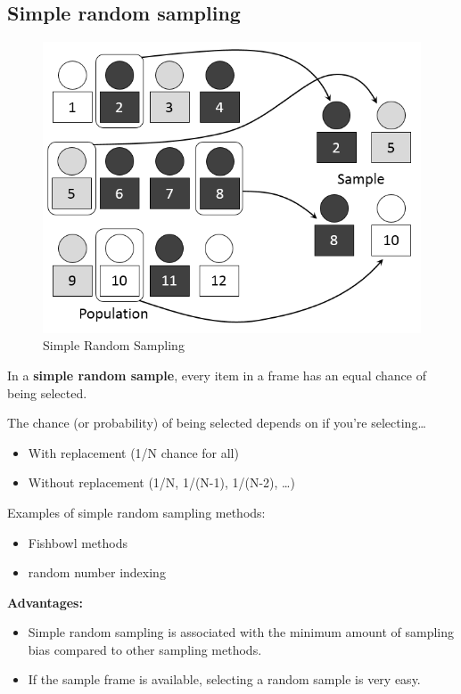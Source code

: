 \documentclass[
]{book}
\providecommand{\tightlist}{%
  \setlength{\itemsep}{0pt}\setlength{\parskip}{0pt}}
\begin{document}
\hypertarget{simple-random-sampling}{%
\subsection{Simple random sampling}\label{simple-random-sampling}}

\begin{figure}

{\centering \includegraphics[width=0.5\linewidth]{images/random} 

}

\caption{Simple Random Sampling}\label{fig:unnamed-chunk-22}
\end{figure}

In a \textbf{simple random sample}, every item in a frame has an equal chance of being selected.

The chance (or probability) of being selected depends on if you're selecting\ldots{}

\begin{itemize}
\tightlist
\item
  With replacement (1/N chance for all)
\item
  Without replacement (1/N, 1/(N-1), 1/(N-2), \ldots)
\end{itemize}

Examples of simple random sampling methods:

\begin{itemize}
\tightlist
\item
  Fishbowl methods
\item
  random number indexing
\end{itemize}

\textbf{Advantages:}

\begin{itemize}
\item
  Simple random sampling is associated with the minimum amount of sampling bias compared to other sampling methods.
\item
  If the sample frame is available, selecting a random sample is very easy.
\end{itemize}
\end{document}
